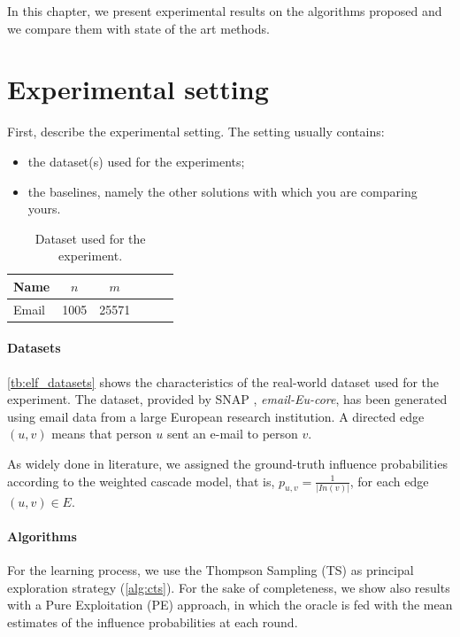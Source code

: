 \begin{example}
In this chapter, we present experimental results on the algorithms proposed and we compare them with state of the art methods.
\end{example}

\section{Experimental setting}

First, describe the experimental setting. The setting usually contains:
\begin{itemize}
\item the dataset(s) used for the experiments;
\item the baselines, namely the other solutions with which you are comparing yours.
\end{itemize}

\begin{example}

\begin{table}[H]
\centering
\renewcommand{\arraystretch}{1.2}
\begin{tabular}{|l|c|c|c|c|c|}\hline
\textbf{Name}&$n$&$m$\\ \hline\hline
Email&1005&25571\\ \hline
\end{tabular}
\caption{Dataset used for the experiment.}
\label{tb:elf_datasets}
\end{table}

\paragraph{Datasets} \autoref{tb:elf_datasets} shows the characteristics of the real-world dataset used for the experiment. The dataset, provided by SNAP \cite{snapnets}, \emph{email-Eu-core}, has been generated using email data from a large European research institution. A directed edge $(u, v)$ means that person $u$ sent an e-mail to person $v$.

As widely done in literature, we assigned the ground-truth influence probabilities according to the weighted cascade model, that is, $p_{u,v}=\frac{1}{|In(v)|}$, for each edge $(u,v) \in E$.

\paragraph{Algorithms}

For the learning process, we use the Thompson Sampling (TS) as principal exploration strategy (\autoref{alg:cts}). For the sake of completeness, we show also results with a Pure Exploitation (PE) approach, in which the oracle is fed with the mean estimates of the influence probabilities at each round.

\end{example}

